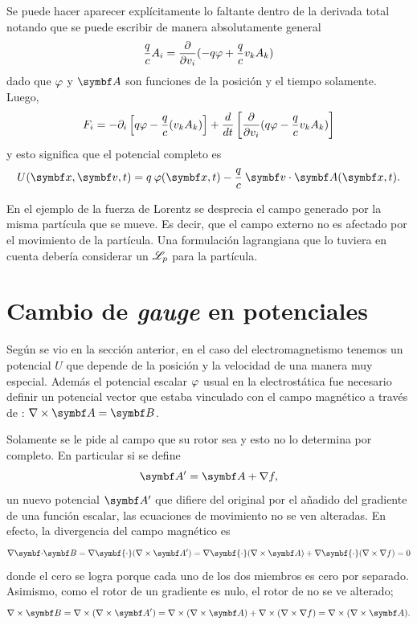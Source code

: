 \documentclass[10pt,oneside]{CBFT_book}
\begin{document}
Se puede hacer aparecer explícitamente lo faltante dentro de la derivada total notando que se puede escribir de manera absolutamente general
\[
	\frac{q}{c} A_i =  \frac{\partial^{\hspace{-0.05em}} {}}{\partial {v_i}^{\hspace{-0.05em}}} ( - q\varphi + \frac{q}{c} v_k A_k )
\]
dado que $\varphi$ y $\vb{A}$ son funciones de la posición y el tiempo solamente. Luego,
\[
	F_i = - \partial_i \left[ q\varphi - \frac{q}{c}  (v_k A_k) \right] + \frac{d^{\hspace{-0.05em}} {}}{d {t}^{\hspace{-0.05em}}} \left[ \frac{\partial^{\hspace{-0.05em}} {}}{\partial {v_i}^{\hspace{-0.05em}}} ( q\varphi - \frac{q}{c} v_k A_k ) \right]
\]
y esto significa que el potencial completo es
\[
	U(\vb{x},\vb{v},t) = q \: \vp(\vb{x},t) - \frac{q}{c} \: \pe{v}{A}(\vb{x},t).
\]

En el ejemplo de la fuerza de Lorentz se desprecia el campo generado por la misma partícula que se mueve. Es decir, 
que el campo externo no es afectado por el movimiento de la partícula.
Una formulación lagrangiana que lo tuviera en cuenta debería considerar un $\mathscr{L}_p$ para la partícula.

\section{Cambio de {\it gauge} en potenciales}

Según se vio en la sección anterior, en el caso del electromagnetismo tenemos un potencial $ U $ que depende de la posición y la velocidad
de una manera muy especial. Además el potencial escalar $ \varphi $ usual en la electrostática fue necesario definir un potencial vector 
que estaba vinculado con el campo magnético  a través de : $\rotorm{A}=\vb{B}$.

Solamente se le pide al campo  que su rotor sea  y esto no lo determina por completo. En particular si se define 
\[
	\vb{A}' = \vb{A} + \nabla f,
\]
un nuevo potencial $\vb{A}'$ que difiere del original por el añadido del gradiente de una función escalar, las ecuaciones de movimiento
no se ven alteradas. En efecto, la divergencia del campo magnético  es
\[
	\divem{B} = \nabla \symbf{\cdot} (\rotorm{A}') = 
	\nabla \symbf{\cdot} (\rotorm{A}) + \nabla \symbf{\cdot} (\nabla \times {\nabla f}) = 0
\]
donde el cero se logra porque cada uno de los dos miembros es cero por separado.
Asimismo, como el rotor de un gradiente es nulo, el rotor de  no se ve alterado;
\[
	\rotorm{B} = \nabla \times( \rotorm{A}' ) =
	\nabla \times( \rotorm{A} ) + \nabla \times ( \nabla \times \nabla f ) =
	\nabla \times( \rotorm{A} ).
\]
\end{document}

